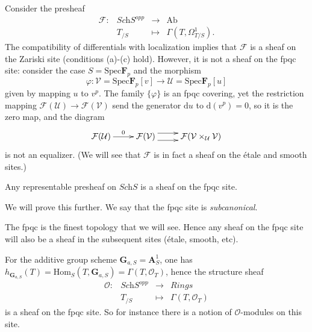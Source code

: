 \begin{example}
\label{example-quasi-coherent}
Consider the presheaf 
$$
\begin{matrix}
\mathcal{F} : & \textit{Sch}S^{opp} & \to & \text{Ab} \\
& T_{/S} & \mapsto & \Gamma(T, \Omega^1_{T/S}).
\end{matrix}
$$
The compatibility of differentials with localization implies that
$\mathcal{F}$ is a sheaf on the Zariski site (conditions (a)-(c) hold).
However, it is not a sheaf on the fpqc site: consider the case
$S = \text{Spec} \mathbf{F}_p$ and the morphism
$$
\varphi: \mathcal{V} =
\text{Spec} \mathbf{F}_p[v] \to \mathcal{U} = 
\text{Spec} \mathbf{F}_p[u]
$$
given by mapping $u$ to $v^p$. The family $\{\varphi \}$ is an fpqc covering, 
yet the restriction mapping $\mathcal{F}(\mathcal{U}) \to 
\mathcal{F}(\mathcal{V})$ send the generator $\mathrm{d} u$ to $\mathrm{d}(v^p) 
= 0$, so it is the zero map, and the diagram
$$
\xymatrix{
\mathcal{F}(\mathcal{U}) \ar[r]^{0} &
\mathcal{F}(\mathcal{V}) \ar@<1ex>[r] \ar@<-1ex>[r] &
\mathcal{F}(\mathcal{V} \times_\mathcal{U} \mathcal{V})
}
$$
is not an equalizer. (We will see that $\mathcal{F}$ is in fact a sheaf on the 
\'etale and smooth sites.)
\end{example}

\begin{lemma}
\label{lemma-representable-sheaf-fpqc}
Any representable presheaf on $\textit{Sch}S$ is a sheaf on the fpqc site.
\end{lemma}

\noindent
We will prove this further. We say that the fpqc site is {\it subcanonical}.

\begin{remark}
\label{remark-fpqc-finest}
The fpqc is the finest topology that we will see. Hence any sheaf on the 
fpqc site will also be a sheaf in the subsequent sites (\'etale, smooth, etc).
\end{remark}

\begin{example}
\label{example-additive-group-sheaf}
For the additive group scheme $\mathbf{G}_{a,S} = \mathbf{A}^1_S$, one has 
$h_{\mathbf{G}_{a,S}} (T) = \text{Hom}_S (T,\mathbf{G}_{a,S}) = 
\Gamma(T,\mathcal{O}_T)$, hence the structure sheaf
$$
\begin{matrix}
\mathcal{O} : &
\textit{Sch}S^{opp} &
\to &
\textit{Rings} \\
&
T_{/S} &
\mapsto &
\Gamma(T, \mathcal{O}_{T})
\end{matrix}
$$
is a sheaf on the fpqc site. So for instance there is a notion of 
$\mathcal{O}$-modules on this site.
\end{example}




